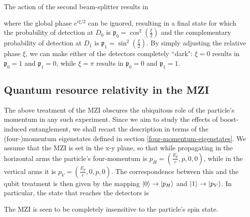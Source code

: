 \documentclass[12pt,a4paper,notitlepage]{report}
\begin{document}
%
The action of the second beam-splitter results in

%
where the global phase $e^{i\xi/2}$ can be ignored, resulting in a final state for which the probability of detection at $D_0$ is $\mathfrak{p}_0 = \cos^2(\frac{\xi}{2})$ and the complementary probability of detection at $D_1$ is $\mathfrak{p}_1 = \sin^2(\frac{\xi}{2})$. By simply adjusting the relative phase $\xi$, we can make either of the detectors completely ``dark": $\xi = 0$ results in $\mathfrak{p}_0 = 1$ and $\mathfrak{p}_1 = 0$, while $\xi = \pi$ results in $\mathfrak{p}_0 = 0$ and $\mathfrak{p}_1 = 1$.

\subsection{Quantum resource relativity in the MZI}

The above treatment of the MZI obscures the ubiquitous role of the particle's momentum in any such experiment. Since we aim to study the effects of boost-induced entanglement, we shall recast the description in terms of the (four-)momentum eigenstates defined in section \ref{four-momentum-eigenstates}. We assume that the MZI is set in the x-y plane, so that while propagating in the horizontal arms the particle's four-momentum is $p_H = (\frac{E_p}{c}, p, 0, 0)$, while in the vertical arms it is $p_V = (\frac{E_p}{c}, 0, p, 0)$. The correspondence between this and the qubit treatment is then given by the mapping $\ket{0}\rightarrow\ket{p_H}$ and $\ket{1}\rightarrow\ket{p_V}$. In particular, the state that reaches the detectors is

%
The MZI is seen to be completely insensitive to the particle's spin state.
\end{document}
